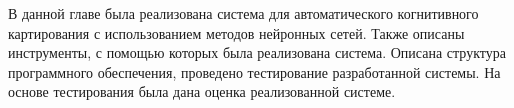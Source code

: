 В данной главе была реализована система для автоматического когнитивного картирования с использованием
методов нейронных сетей.
Также описаны инструменты, с помощью которых была реализована система.
Описана структура программного обеспечения, проведено тестирование разработанной системы.
На основе тестирования была дана оценка реализованной системе.


